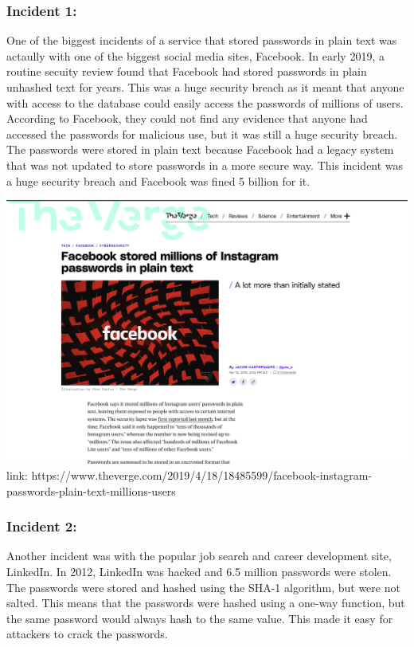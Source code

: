 \documentclass{article}
\begin{document}
\subsubsection*{Incident 1:}
One of the biggest incidents of a service that stored passwords in plain text was actaully
with one of the biggest social media sites, Facebook. In early 2019, a routine secuity review
found that Facebook had stored passwords in plain unhashed text for years. This was a huge
security breach as it meant that anyone with access to the database could easily access the
passwords of millions of users. According to Facebook, they could not find any evidence that
anyone had accessed the passwords for malicious use, but it was still a huge security breach. The passwords were
stored in plain text because Facebook had a legacy system that was not updated to store passwords
in a more secure way. This incident was a huge security breach and Facebook was fined 5 billion
for it.

\begin{center}
    \includegraphics[scale=.22]{images/verge_source.png}
    link: https://www.theverge.com/2019/4/18/18485599/facebook-instagram-passwords-plain-text-millions-users
\end{center}

\subsubsection*{Incident 2:}
Another incident was with the popular job search and career development site, LinkedIn. 
In 2012, LinkedIn was hacked and 6.5 million passwords were stolen. The passwords were stored
and hashed using the SHA-1 algorithm, but were not salted. This means that the passwords were
hashed using a one-way function, but the same password would always hash to the same value.
This made it easy for attackers to crack the passwords. 
\end{document}
